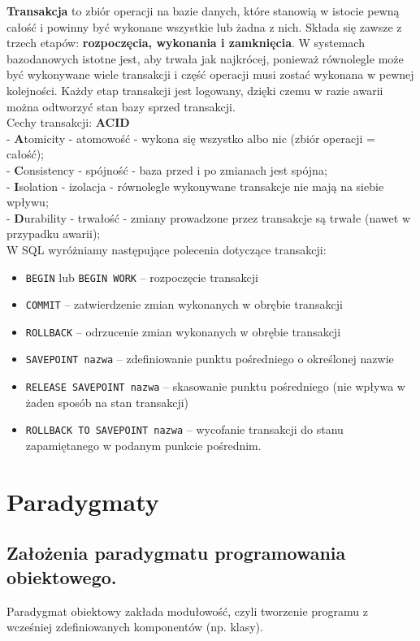 \documentclass[a4paper,12pt,oneside]{book}
\begin{document}
		\textbf{Transakcja} to zbiór operacji na bazie danych, które stanowią w istocie pewną całość i powinny być wykonane wszystkie lub żadna z nich. Składa się zawsze z trzech etapów: \textbf{rozpoczęcia, wykonania i zamknięcia}. W systemach bazodanowych istotne jest, aby trwała jak najkrócej, ponieważ równolegle może być wykonywane wiele transakcji i część operacji musi zostać wykonana w pewnej kolejności. Każdy etap transakcji jest logowany, dzięki czemu w razie awarii można odtworzyć stan bazy sprzed transakcji. \\
		Cechy transakcji: \textbf{ACID} \\
		- \textbf{A}tomicity - atomowość - wykona się wszystko albo nic (zbiór operacji = całość); \\
		- \textbf{C}onsistency - spójność - baza przed i po zmianach jest spójna; \\
		- \textbf{I}solation - izolacja - równolegle wykonywane transakcje nie mają na siebie wpływu; \\
		- \textbf{D}urability - trwałość - zmiany prowadzone przez transakcje są trwałe (nawet w przypadku awarii);\\
		W SQL wyróżniamy następujące polecenia dotyczące transakcji:
		\begin{itemize}
			\itemsep 0em
			\item \verb*|BEGIN| lub \verb*|BEGIN WORK| – rozpoczęcie transakcji
			\item \verb*|COMMIT| – zatwierdzenie zmian wykonanych w obrębie transakcji
			\item \verb*|ROLLBACK| – odrzucenie zmian wykonanych w obrębie transakcji
			\item \verb*|SAVEPOINT nazwa| – zdefiniowanie punktu pośredniego o określonej nazwie
			\item \verb*|RELEASE SAVEPOINT nazwa| – skasowanie punktu pośredniego (nie wpływa w żaden sposób na stan transakcji)
			\item \verb*|ROLLBACK TO SAVEPOINT nazwa| – wycofanie transakcji do stanu zapamiętanego w podanym punkcie pośrednim.
		\end{itemize}
		\newpage\section{Paradygmaty}
			\subsection{Założenia paradygmatu programowania obiektowego.}
				Paradygmat obiektowy zakłada modułowość, czyli tworzenie programu z wcześniej
				zdefiniowanych komponentów (np. klasy).
				
\end{document}
